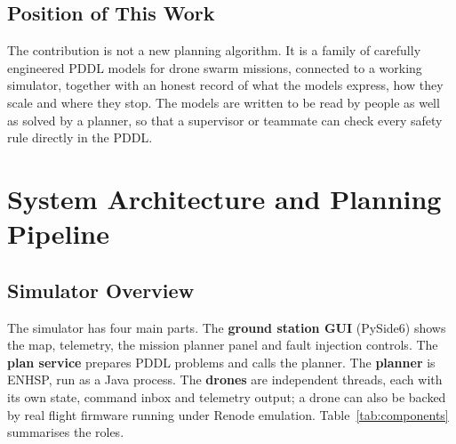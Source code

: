 \documentclass[11pt,a4paper,oneside]{report}
\begin{document}
\section{Position of This Work}
The contribution is not a new planning algorithm. It is a family of carefully engineered PDDL
models for drone swarm missions, connected to a working simulator, together with an honest record
of what the models express, how they scale and where they stop. The models are written to be
read by people as well as solved by a planner, so that a supervisor or teammate can check every
safety rule directly in the PDDL.

\chapter{System Architecture and Planning Pipeline}\label{ch:arch}

\section{Simulator Overview}
The simulator has four main parts. The \textbf{ground station GUI} (PySide6) shows the map,
telemetry, the mission planner panel and fault injection controls. The \textbf{plan service}
prepares PDDL problems and calls the planner. The \textbf{planner} is ENHSP, run as a Java
process. The \textbf{drones} are independent threads, each with its own state, command inbox and
telemetry output; a drone can also be backed by real flight firmware running under Renode
emulation. Table~\ref{tab:components} summarises the roles.
\end{document}
